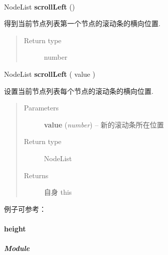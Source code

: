 \documentclass[letterpaper,10pt,english]{sphinxmanual}
\begin{document}
\begin{fulllineitems}
\label{api/core/node/scrollLeft:Node.scrollLeft}~
\begin{DUlineblock}{0em}
\item[] NodeList \textbf{scrollLeft} ()
\item[] 得到当前节点列表第一个节点的滚动条的横向位置.
\end{DUlineblock}
\begin{quote}\begin{description}
\item[{Return type}] \leavevmode
number

\end{description}\end{quote}

\begin{DUlineblock}{0em}
\item[] NodeList \textbf{scrollLeft} ( value )
\item[] 设置当前节点列表每个节点的滚动条的横向位置.
\end{DUlineblock}
\begin{quote}\begin{description}
\item[{Parameters}] \leavevmode
\textbf{value} (\emph{number}) -- 新的滚动条所在位置

\item[{Return type}] \leavevmode
NodeList

\item[{Returns}] \leavevmode
自身 this

\end{description}\end{quote}

例子可参考： 

\end{fulllineitems}



\paragraph{height}
\label{api/core/node/height::doc}\label{api/core/node/height:height}

\subparagraph{Module}
\label{api/core/node/height:module}\begin{quote}

{\hyperref[api/core/node/index:module-Node]{}}
\end{quote}
\end{document}
